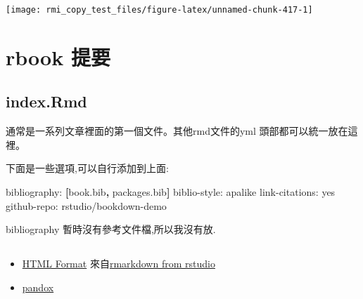 \documentclass[]{book}
\newenvironment{Shaded}{\begin{snugshade}}{\end{snugshade}}
\newcommand{\KeywordTok}[1]{\textcolor[rgb]{0.13,0.29,0.53}{\textbf{#1}}}
\newcommand{\DataTypeTok}[1]{\textcolor[rgb]{0.13,0.29,0.53}{#1}}
\newcommand{\StringTok}[1]{\textcolor[rgb]{0.31,0.60,0.02}{#1}}
\newcommand{\FunctionTok}[1]{\textcolor[rgb]{0.00,0.00,0.00}{#1}}
\newcommand{\OperatorTok}[1]{\textcolor[rgb]{0.81,0.36,0.00}{\textbf{#1}}}
\newcommand{\AttributeTok}[1]{\textcolor[rgb]{0.77,0.63,0.00}{#1}}
\newcommand{\NormalTok}[1]{#1}
\providecommand{\tightlist}{%
  \setlength{\itemsep}{0pt}\setlength{\parskip}{0pt}}
\theoremstyle{definition}
\theoremstyle{definition}
\theoremstyle{definition}
\theoremstyle{remark}
\begin{document}
\begin{Shaded}
\end{Shaded}

\begin{center}\texttt{[image: rmi\_copy\_test\_files/figure-latex/unnamed-chunk-417-1]} \end{center}

\chapter{rbook 提要}\label{rbook-}

\section{index.Rmd}\label{index.rmd}

通常是一系列文章裡面的第一個文件。其他rmd文件的yml
頭部都可以統一放在這裡。

下面是一些選項,可以自行添加到上面:

\begin{Shaded}
\begin{Highlighting}[]
\FunctionTok{bibliography:}\AttributeTok{ }\KeywordTok{[}\NormalTok{book.bib}\KeywordTok{,}\NormalTok{ packages.bib}\KeywordTok{]}
\FunctionTok{biblio-style:}\AttributeTok{ apalike}
\FunctionTok{link-citations:}\AttributeTok{ yes}
\FunctionTok{github-repo:}\AttributeTok{ rstudio/bookdown-demo}
\end{Highlighting}
\end{Shaded}

bibliography 暫時沒有參考文件檔,所以我沒有放.

\hypertarget{section-1}{\section{}\label{section-1}}

\begin{itemize}
\tightlist
\item
  \href{https://rmarkdown.rstudio.com/r_notebook_format.html}{HTML
  Format} 來自\href{https://github.com/rstudio/rmarkdown}{rmarkdown from
  rstudio}
\item
  \href{http://conjugateprior.org/2012/12/r-markdown-to-other-document-formats/}{pandox}
\end{itemize}
\end{document}
